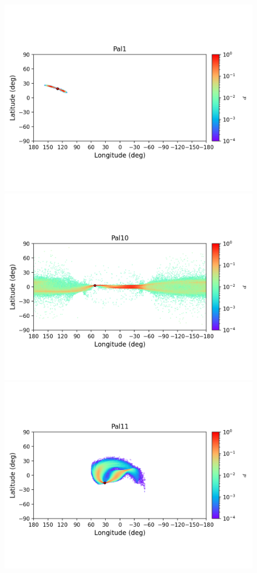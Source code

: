         \begin{figure}
        \includegraphics[clip=true, trim = 0mm 20mm 0mm 10mm, width=1\columnwidth]{images/error_plots_Pal1.png}
        \includegraphics[clip=true, trim = 0mm 20mm 0mm 10mm, width=1\columnwidth]{images/error_plots_Pal10.png}
        \includegraphics[clip=true, trim = 0mm 20mm 0mm 10mm, width=1\columnwidth]{images/error_plots_Pal11.png}

\end{figure}
